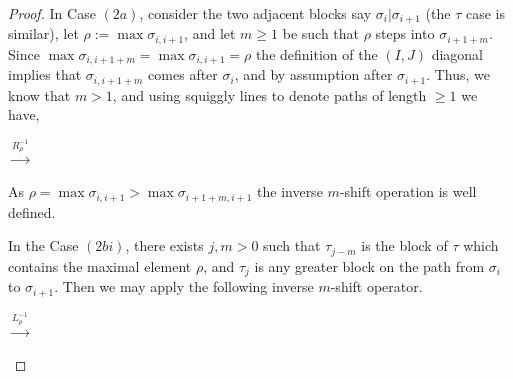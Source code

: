 \documentclass{amsart}
\theoremstyle{definition}
\newcommand{\ssm}{\smallsetminus} %
\begin{document}
\begin{proof}
In Case $(2a)$, consider the two adjacent blocks say $\sigma_i|\sigma_{i+1}$ (the $\tau$ case is similar), let $\rho:=\max \sigma_{i,i+1}$, and let $m\geq 1$ be such that $\rho$ steps into $\sigma_{i+1+m}$. 
Since $\max \sigma_{i,i+1+m} = \max \sigma_{i,i+1}= \rho$ the definition of the $(I,J)$ diagonal implies that $\sigma_{i,i+1+m}$ comes after $\sigma_{i}$, and by assumption after $\sigma_{i+1}$. 
Thus, we know that $m > 1$, and using squiggly lines to denote paths of length $\geq 1$ we have,
\begin{center}
$\xrightarrow{R_\rho^{-1}}$
\end{center}
As $\rho=\max \sigma_{i,i+1} > \max\sigma_{i+1+m,i+1}$ the inverse $m$-shift operation is well defined.

In the Case $(2bi)$, there exists $j,m>0$ such that $\tau_{j-m}$ is the block of $\tau$ which contains the maximal element $\rho$, and $\tau_j$ is any greater block on the path from $\sigma_i$ to $\sigma_{i+1}$. 
Then we may apply the following inverse $m$-shift operator.
\begin{center}
$\xrightarrow{L_\rho^{-1}}$
\end{center}


\end{proof}
\end{document}
